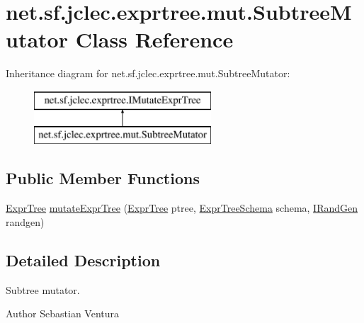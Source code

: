 \hypertarget{classnet_1_1sf_1_1jclec_1_1exprtree_1_1mut_1_1_subtree_mutator}{\section{net.\-sf.\-jclec.\-exprtree.\-mut.\-Subtree\-Mutator Class Reference}
\label{classnet_1_1sf_1_1jclec_1_1exprtree_1_1mut_1_1_subtree_mutator}
}
Inheritance diagram for net.\-sf.\-jclec.\-exprtree.\-mut.\-Subtree\-Mutator\-:\begin{figure}[H]
\begin{center}
\leavevmode
\includegraphics[height=2.000000cm]{classnet_1_1sf_1_1jclec_1_1exprtree_1_1mut_1_1_subtree_mutator}
\end{center}
\end{figure}
\subsection*{Public Member Functions}
\begin{DoxyCompactItemize}
\item 
\hyperlink{classnet_1_1sf_1_1jclec_1_1exprtree_1_1_expr_tree}{Expr\-Tree} \hyperlink{classnet_1_1sf_1_1jclec_1_1exprtree_1_1mut_1_1_subtree_mutator_abe516799e322fdfc3adc78517299ed80}{mutate\-Expr\-Tree} (\hyperlink{classnet_1_1sf_1_1jclec_1_1exprtree_1_1_expr_tree}{Expr\-Tree} ptree, \hyperlink{classnet_1_1sf_1_1jclec_1_1exprtree_1_1_expr_tree_schema}{Expr\-Tree\-Schema} schema, \hyperlink{interfacenet_1_1sf_1_1jclec_1_1util_1_1random_1_1_i_rand_gen}{I\-Rand\-Gen} randgen)
\end{DoxyCompactItemize}


\subsection{Detailed Description}
Subtree mutator.

\begin{DoxyAuthor}{Author}
Sebastian Ventura 
\end{DoxyAuthor}


